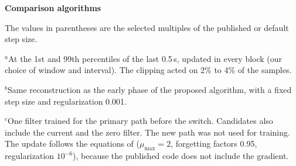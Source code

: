 \begin{table}[tbp]
\textbf{Comparison algorithms}\par\smallskip
{}
\par\medskip
\begin{minipage}{0.98\textwidth}
\footnotesize
The values in parentheses are the selected multiples of the published or default step size.\par
$^{a}$At the 1st and 99th percentiles of the last 0.5\,s, updated in every block (our choice of window and interval). The clipping acted on 2\% to 4\% of the samples.\par
$^{b}$Same reconstruction as the early phase of the proposed algorithm, with a fixed step size and regularization 0.001.\par
$^{c}$One filter trained for the primary path before the switch. Candidates also include the current and the zero filter. The new path was not used for training. The update follows the equations of \cite{yin2023} ($\mu_{\max} = 2$, forgetting factors 0.95, regularization $10^{-6}$), because the published code does not include the gradient.\par
\end{minipage}
\end{table}

